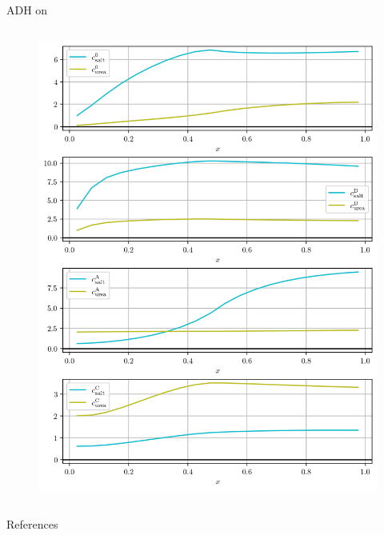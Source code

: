 \documentclass{beamer}
\begin{document}
\begin{frame}{ADH on}
\begin{columns}[T]
    \begin{column}{0.5\textwidth}
        \begin{figure}
            \centering
            \includegraphics[width=\textwidth]{results/4-7-2023/ADH_c.png}
        \end{figure}
    \end{column}

\end{columns}
    
\end{frame}

\begin{frame}[allowframebreaks]{References}
    
    \tiny
\end{frame}
\end{document}
